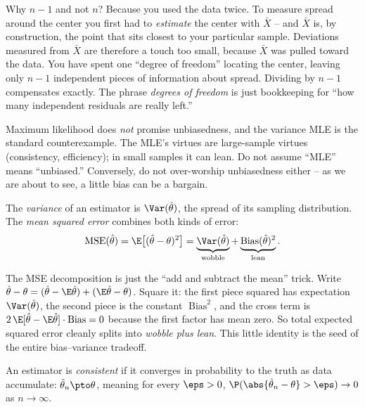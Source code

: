 \begin{whybox}
Why $n-1$ and not $n$? Because you used the data twice. To measure spread around
the center you first had to \emph{estimate} the center with $\bar X$ -- and
$\bar X$ is, by construction, the point that sits closest to your particular
sample. Deviations measured from $\bar X$ are therefore a touch too small,
because $\bar X$ was pulled toward the data. You have spent one ``degree of
freedom'' locating the center, leaving only $n-1$ independent pieces of
information about spread. Dividing by $n-1$ compensates exactly. The phrase
\emph{degrees of freedom} is just bookkeeping for ``how many independent
residuals are really left.''
\end{whybox}

\begin{trapbox}
Maximum likelihood does \emph{not} promise unbiasedness, and the variance MLE is
the standard counterexample. The MLE's virtues are large-sample virtues
(consistency, efficiency); in small samples it can lean. Do not assume ``MLE''
means ``unbiased.'' Conversely, do not over-worship unbiasedness either -- as we
are about to see, a little bias can be a bargain.
\end{trapbox}

\begin{definition}
\label{ch30:def-mse}
The \emph{variance} of an estimator is $\Var(\hat\theta)$, the spread of its
sampling distribution. The \emph{mean squared error} combines both kinds of
error:
\[
  \mathrm{MSE}(\hat\theta) = \E\big[(\hat\theta-\theta)^2\big]
  = \underbrace{\Var(\hat\theta)}_{\text{wobble}}
  + \underbrace{\operatorname{Bias}(\hat\theta)^2}_{\text{lean}}.
\]
\end{definition}

\begin{whybox}
The MSE decomposition is just the ``add and subtract the mean'' trick. Write
$\hat\theta-\theta = (\hat\theta-\E\hat\theta)+(\E\hat\theta-\theta)$. Square it:
the first piece squared has expectation $\Var(\hat\theta)$, the second piece is
the constant $\operatorname{Bias}^2$, and the cross term is
$2\,\E[\hat\theta-\E\hat\theta]\cdot\operatorname{Bias}=0$ because the first
factor has mean zero. So total expected squared error cleanly splits into
\emph{wobble plus lean}. This little identity is the seed of the entire
bias--variance tradeoff.
\end{whybox}

\begin{definition}[Consistency]
\label{ch30:def-consistency}
An estimator is \emph{consistent} if it converges in probability to the truth as
data accumulate:
$\hat\theta_n \pto \theta$, meaning for every $\eps>0$,
$\P(\abs{\hat\theta_n - \theta} > \eps)\to 0$ as $n\to\infty$.
\end{definition}

